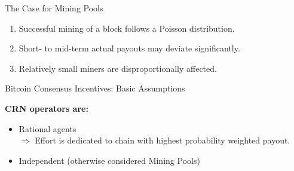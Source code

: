 \documentclass[handout]{beamer}
\begin{document}
\begin{frame}{The Case for Mining Pools}

	\begin{enumerate}
		\item Successful mining of a block follows a Poisson distribution.
		\item Short- to mid-term actual payouts may deviate significantly.
		\item Relatively small miners are disproportionally affected.
	\end{enumerate}

\vspace{1 em}


\end{frame}

\begin{frame}{Bitcoin Consensus Incentives: Basic Assumptions}

\textbf{CRN operators are:}
\begin{itemize}
	\item	Rational agents\\$\Rightarrow$ Effort is dedicated to chain with highest probability weighted payout.
	\item	Independent (otherwise considered Mining Pools)
\end{itemize}

\vspace{1.5 em}


\end{frame}
\end{document}
